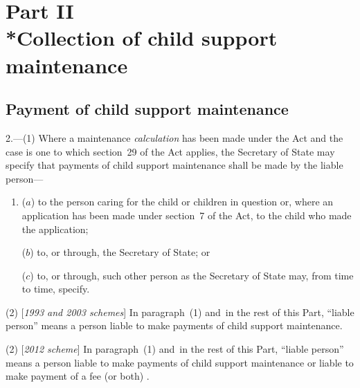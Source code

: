 \documentclass[12pt,a4paper]{article}
\begin{document}

\section[Part II --- Collection of child support maintenance]{Part II\\*Collection of child support maintenance}

\renewcommand\parthead{--- Part II}

\subsection[2. Payment of child support maintenance]{Payment of child support maintenance}

2.—(1) Where a maintenance 
\emph{calculation}  %
has been made under the Act and the case is one to which section~29 of the Act applies, the Secretary of State may specify that payments of child support maintenance shall be made by the liable person—
\begin{enumerate}\item[]
($a$) to the person caring for the child or children in question or, where an application has been made under section~7 of the Act, to the child who made the application;

($b$) to, or through, the Secretary of State; or

($c$) to, or through, such other person as the Secretary of State may, from time to time, specify.
\end{enumerate}

(2) [\emph{1993 and 2003 schemes}] In paragraph~(1) and~in the rest of this Part, “liable person” means a person liable to make payments of child support maintenance.

(2) [\emph{2012 scheme}] In paragraph~(1) and~in the rest of this Part, “liable person” means a person liable to make payments of child support maintenance
or liable to make payment of a fee (or both)%
.
\end{document}
